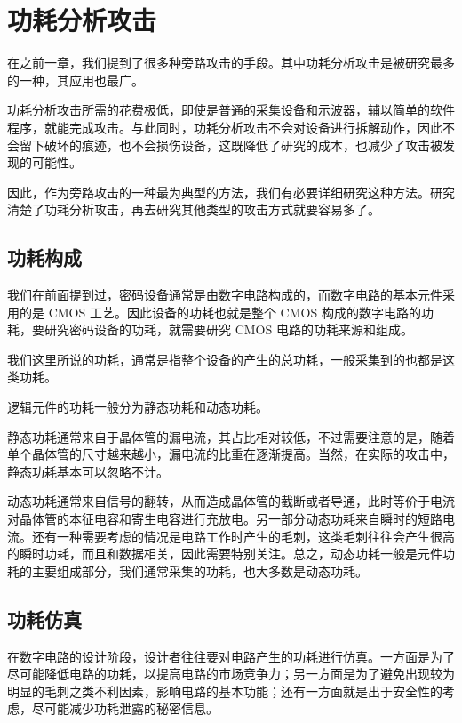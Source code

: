 
\chapter{功耗分析攻击}
在之前一章，我们提到了很多种旁路攻击的手段。其中功耗分析攻击是被研究最多的一种，其应用也最广。

功耗分析攻击所需的花费极低，即使是普通的采集设备和示波器，辅以简单的软件程序，就能完成攻击。与此同时，功耗分析攻击不会对设备进行拆解动作，因此不会留下破坏的痕迹，也不会损伤设备，这既降低了研究的成本，也减少了攻击被发现的可能性。

因此，作为旁路攻击的一种最为典型的方法，我们有必要详细研究这种方法。研究清楚了功耗分析攻击，再去研究其他类型的攻击方式就要容易多了。

\section{功耗构成}  %
我们在前面提到过，密码设备通常是由数字电路构成的，而数字电路的基本元件采用的是 CMOS 工艺。因此设备的功耗也就是整个 CMOS 构成的数字电路的功耗，要研究密码设备的功耗，就需要研究 CMOS 电路的功耗来源和组成。

我们这里所说的功耗，通常是指整个设备的产生的总功耗，一般采集到的也都是这类功耗。

逻辑元件的功耗一般分为静态功耗和动态功耗。

静态功耗通常来自于晶体管的漏电流，其占比相对较低，不过需要注意的是，随着单个晶体管的尺寸越来越小，漏电流的比重在逐渐提高。当然，在实际的攻击中，静态功耗基本可以忽略不计。

动态功耗通常来自信号的翻转，从而造成晶体管的截断或者导通，此时等价于电流对晶体管的本征电容和寄生电容进行充放电。另一部分动态功耗来自瞬时的短路电流。还有一种需要考虑的情况是电路工作时产生的毛刺，这类毛刺往往会产生很高的瞬时功耗，而且和数据相关，因此需要特别关注。总之，动态功耗一般是元件功耗的主要组成部分，我们通常采集的功耗，也大多数是动态功耗。 \cite{paa_cn}


\section{功耗仿真}  %
在数字电路的设计阶段，设计者往往要对电路产生的功耗进行仿真。一方面是为了尽可能降低电路的功耗，以提高电路的市场竞争力；另一方面是为了避免出现较为明显的毛刺之类不利因素，影响电路的基本功能；还有一方面就是出于安全性的考虑，尽可能减少功耗泄露的秘密信息。

